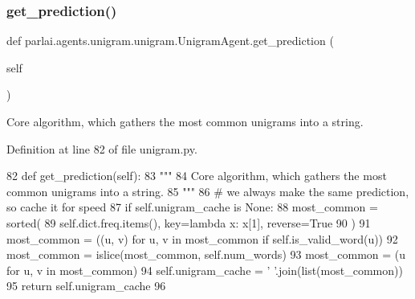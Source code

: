 \subsubsection{\texorpdfstring{get\+\_\+prediction()}{get\_prediction()}}
{\footnotesize\ttfamily def parlai.\+agents.\+unigram.\+unigram.\+Unigram\+Agent.\+get\+\_\+prediction (\begin{DoxyParamCaption}\item[{}]{self }\end{DoxyParamCaption})}

\begin{DoxyVerb}Core algorithm, which gathers the most common unigrams into a string.
\end{DoxyVerb}
 

Definition at line 82 of file unigram.\+py.


\begin{DoxyCode}
82     \textcolor{keyword}{def }get\_prediction(self):
83         \textcolor{stringliteral}{"""}
84 \textcolor{stringliteral}{        Core algorithm, which gathers the most common unigrams into a string.}
85 \textcolor{stringliteral}{        """}
86         \textcolor{comment}{# we always make the same prediction, so cache it for speed}
87         \textcolor{keywordflow}{if} self.unigram\_cache \textcolor{keywordflow}{is} \textcolor{keywordtype}{None}:
88             most\_common = sorted(
89                 self.dict.freq.items(), key=\textcolor{keyword}{lambda} x: x[1], reverse=\textcolor{keyword}{True}
90             )
91             most\_common = ((u, v) \textcolor{keywordflow}{for} u, v \textcolor{keywordflow}{in} most\_common \textcolor{keywordflow}{if} self.is\_valid\_word(u))
92             most\_common = islice(most\_common, self.num\_words)
93             most\_common = (u \textcolor{keywordflow}{for} u, v \textcolor{keywordflow}{in} most\_common)
94             self.unigram\_cache = \textcolor{stringliteral}{' '}.join(list(most\_common))
95         \textcolor{keywordflow}{return} self.unigram\_cache
96 
\end{DoxyCode}
\mbox{\label{classparlai_1_1agents_1_1unigram_1_1unigram_1_1UnigramAgent_ae00fc04461f0ff1442bd894a5b574a3e}} 
